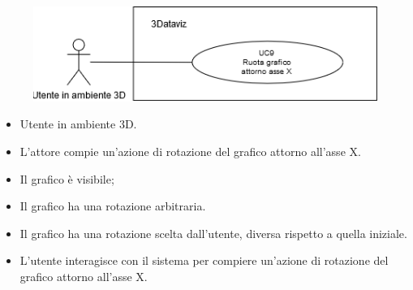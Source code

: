 \begin{figure}[h!]
    \centering
    \includegraphics[scale=0.65]{template/images/UC9.png}
    \caption{}
\end{figure}
\UCdsc
{ %
    \begin{itemize}
        \item Utente in ambiente 3D.
    \end{itemize}
}
{ %
    \begin{itemize}
        \item L'attore compie un'azione di rotazione del grafico attorno all'asse X.
    \end{itemize}
}
{ %
    \begin{itemize}
        \item Il grafico è visibile;
        \item Il grafico ha una rotazione arbitraria.
    \end{itemize}
}
{ %
    \begin{itemize}
        \item Il grafico ha una rotazione scelta dall'utente, diversa rispetto a quella iniziale.
    \end{itemize}
}
{ %
    \begin{itemize}
        \item L'utente interagisce con il sistema per compiere un'azione di rotazione del grafico attorno all'asse X.
    \end{itemize}
}

